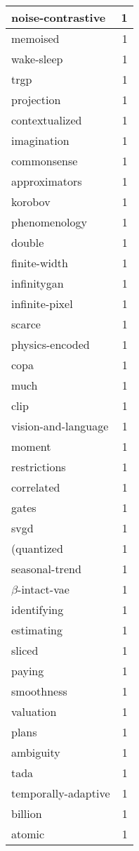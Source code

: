 \begin{table}[h]
\begin{tabular}{|l|r|}
noise-contrastive & 1 \\
\hline
memoised & 1 \\
\hline
wake-sleep & 1 \\
\hline
trgp & 1 \\
\hline
projection & 1 \\
\hline
contextualized & 1 \\
\hline
imagination & 1 \\
\hline
commonsense & 1 \\
\hline
approximators & 1 \\
\hline
korobov & 1 \\
\hline
phenomenology & 1 \\
\hline
double & 1 \\
\hline
finite-width & 1 \\
\hline
infinitygan & 1 \\
\hline
infinite-pixel & 1 \\
\hline
scarce & 1 \\
\hline
physics-encoded & 1 \\
\hline
copa & 1 \\
\hline
much & 1 \\
\hline
clip & 1 \\
\hline
vision-and-language & 1 \\
\hline
moment & 1 \\
\hline
restrictions & 1 \\
\hline
correlated & 1 \\
\hline
gates & 1 \\
\hline
svgd & 1 \\
\hline
(quantized & 1 \\
\hline
seasonal-trend & 1 \\
\hline
$\beta$-intact-vae & 1 \\
\hline
identifying & 1 \\
\hline
estimating & 1 \\
\hline
sliced & 1 \\
\hline
paying & 1 \\
\hline
smoothness & 1 \\
\hline
valuation & 1 \\
\hline
plans & 1 \\
\hline
ambiguity & 1 \\
\hline
tada & 1 \\
\hline
temporally-adaptive & 1 \\
\hline
billion & 1 \\
\hline
atomic & 1 \\

\end{tabular}
\end{table}
